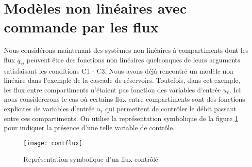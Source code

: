 \section{Modèles non linéaires avec commande par les flux}

Nous considérons maintenant des systèmes non linéaires à compartiments
dont les flux
$q_{ij}$ peuvent être des fonctions non linéaires quelconques de
leurs arguments satisfaisant les conditions C1 - C3. Nous avons déjà rencontré
un modèle non linéaire dans l'exemple de la cascade de
réservoirs. Toutefois, dans cet exemple, les flux entre 
compartiments n'étaient pas fonction des variables d'entrée $u_{\ell}$. Ici nous
considérerons le cas où certains flux entre compartiments sont des fonctions
explicites de variables d'entrée $u_{\ell}$ qui permettent de contr\^oler le débit
passant entre ces compartiments.  On utilise la représentation
symbolique de la figure
\ref{Fig:contflux} pour indiquer la présence d'une telle variable de contr\^ole.
\begin{figure}[ht] 
\begin{center}
\texttt{[image: contflux]}
\caption{Représentation symbolique d'un flux contr\^olé}
\label{Fig:contflux}
\end{center} 
\end{figure}

